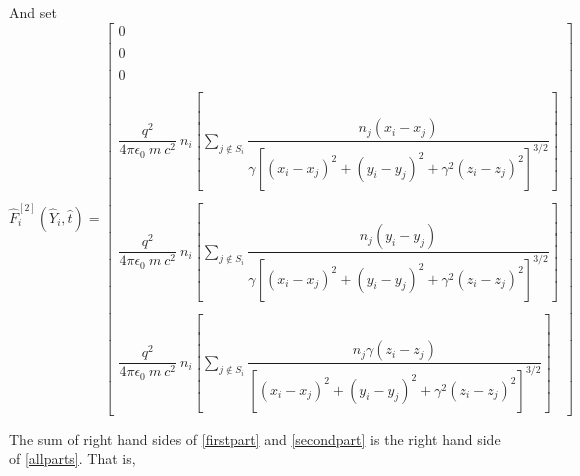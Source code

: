 \documentclass[oneside,12pt]{book}
\begin{document}
And set
\begin{equation}
\hat{F}^{[2]}_i(\hat{Y}_i,\hat{t})=\left[
\begin{array}{c}
0
\\
\\
0
\\
\\
0
\\
\\
\dfrac{q^2}{4 \pi \epsilon_0 \ m \ c^2} \ n_i\left[
\displaystyle\sum\limits_{j \notin S_i}
 \dfrac{n_j (x_i-x_j)}{\gamma[(x_i-x_j)^2+(y_i-y_j)^2+\gamma^2(z_i-z_j)^2]^{3 \slash 2}}\right]
\\
\\
\dfrac{q^2}{4 \pi \epsilon_0 \ m \ c^2} \ n_i\left[
\displaystyle\sum\limits_{j \notin S_i}
 \dfrac{n_j (y_i-y_j)}{\gamma[(x_i-x_j)^2+(y_i-y_j)^2+\gamma^2(z_i-z_j)^2]^{3 \slash 2}}\right]
\\
\\
\dfrac{q^2}{4 \pi \epsilon_0 \ m \ c^2} \ n_i\left[
\displaystyle\sum\limits_{j \notin S_i}
 \dfrac{n_j \gamma(z_i-z_j)}{[(x_i-x_j)^2+(y_i-y_j)^2+\gamma^2(z_i-z_j)^2]^{3 \slash 2}}\right]
\end{array}
\right]
\label{secondpart}
\end{equation}

The sum of right hand sides of \eqref{firstpart} and \eqref{secondpart} is the right hand side of \eqref{allparts}.  That is,

\end{document}
